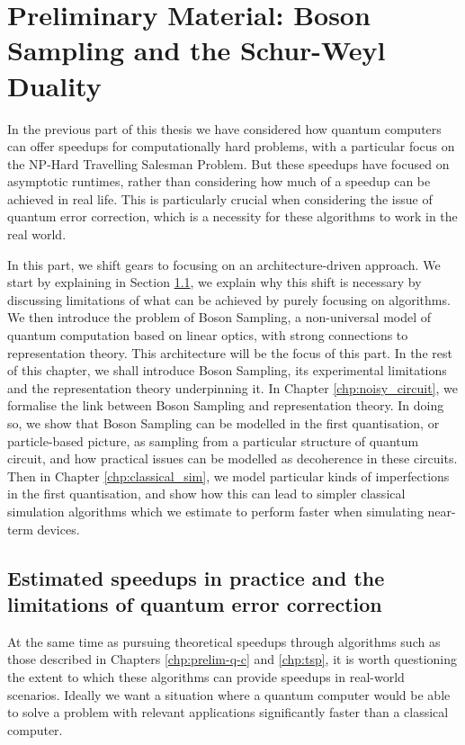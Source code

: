 \chapter{Preliminary Material: Boson Sampling and the Schur-Weyl Duality}
\label{chp:preliminary_bs}

In the previous part of this thesis we have considered how quantum computers can offer speedups for computationally hard problems, with a particular focus on the NP-Hard Travelling Salesman Problem. But these speedups have focused on asymptotic runtimes, rather than considering how much of a speedup can be achieved in real life. This is particularly crucial when considering the issue of quantum error correction, which is a necessity for these algorithms to work in the real world.

In this part, we shift gears to focusing on an architecture-driven approach. We start by explaining in Section \ref{sec:error-correction}, we explain why this shift is necessary by discussing limitations of what can be achieved by purely focusing on algorithms. We then introduce the problem of Boson Sampling, a non-universal model of quantum computation based on linear optics, with strong connections to representation theory. This architecture will be the focus of this part. In the rest of this chapter, we shall introduce Boson Sampling, its experimental limitations and the representation theory underpinning it. In Chapter \ref{chp:noisy_circuit}, we formalise the link between Boson Sampling and representation theory. In doing so, we show that Boson Sampling can be modelled in the first quantisation, or particle-based picture, as sampling from a particular structure of quantum circuit, and how practical issues can be modelled as decoherence in these circuits. Then in Chapter \ref{chp:classical_sim}, we model particular kinds of imperfections in the first quantisation, and show how this can lead to simpler classical simulation algorithms which we estimate to perform faster when simulating near-term devices.

\section{Estimated speedups in practice and the limitations of quantum error correction}
\label{sec:error-correction}

At the same time as pursuing theoretical speedups through algorithms such as those described in Chapters \ref{chp:prelim-q-c} and \ref{chp:tsp}, it is worth questioning the extent to which these algorithms can provide speedups in real-world scenarios. Ideally we want a situation where a quantum computer would be able to solve a problem with relevant applications significantly faster than a classical computer.

